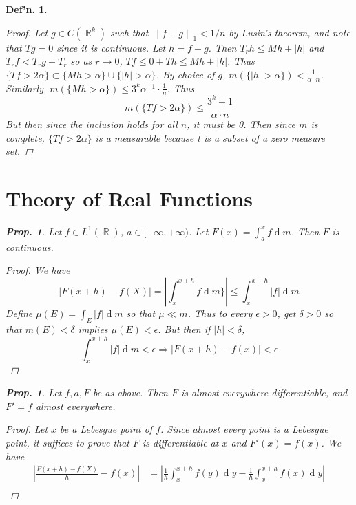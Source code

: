 \documentclass[12pt, a4paper]{book}
\DeclareMathOperator{\R}{\mathbb{R}}
\renewcommand{\d}[1]{\ensuremath{\operatorname{d}\!{#1}}} %
\newcommand{\norm}[1]{\left\lVert#1\right\rVert} %
\newtheorem{definition}[theorem]{Def'n.}
\newtheorem{proposition}[theorem]{Prop.}
\theoremstyle{nonumberplain}
\newtheorem{proof}{Proof}
\begin{document}
\begin{definition}
\begin{proof}
    Let $g\in C(\R^k)$ such that $\norm{f-g}_1<1/n$ by Lusin's theorem, and note that $Tg=0$ since it is continuous.
    Let $h=f-g$.
    Then $T_rh\leq Mh+|h|$ and $T_rf<T_rg+T_r$ so as $r\to 0$, $Tf\leq0+Th\leq Mh+|h|$.
    Thus $\{Tf>2\alpha\}\subset\{Mh>\alpha\}\cup\{|h|>\alpha\}$.
    By choice of $g$, $m(\{|h|>\alpha\})<\frac{1}{\alpha\cdot n}$.
    Similarly, $m(\{Mh>\alpha\})\leq 3^k\alpha^{-1}\cdot\frac{1}{n}$.
    Thus
    \[m(\{Tf>2\alpha\})\leq\frac{3^k+1}{\alpha\cdot n}\]
    But then since the inclusion holds for all $n$, it must be 0.
    Then since $m$ is complete, $\{Tf>2\alpha\}$ is a measurable because t is a subset of a zero measure set.
\end{proof}
\section{Theory of Real Functions}
\begin{proposition}
    Let $f\in L^1(\R)$, $a\in[-\infty,+\infty)$. %
    Let $F(x)=\int_a^x f\d{m}$.
    Then $F$ is continuous.
\end{proposition}
\begin{proof}
    We have
    \begin{equation*}
        |F(x+h)-f(X)| = \left\lvert\int_x^{x+h}f\d{m}\}\right\rvert\leq\int_x^{x+h}|f|\d{m}
    \end{equation*}
    Define $\mu(E)=\int_E|f|\d{m}$ so that $\mu\ll m$.
    Thus to every $\epsilon>0$, get $\delta>0$ so that $m(E)<\delta$ implies $\mu(E)<\epsilon$.
    But then if $|h|<\delta$,
    \begin{equation*}
        \int_x^{x+h}|f|\d{m}<\epsilon\Longrightarrow|F(x+h)-f(x)|<\epsilon
    \end{equation*}
\end{proof}
\begin{proposition}
    Let $f,a,F$ be as above.
    Then $F$ is almost everywhere differentiable, and $F'=f$ almost everywhere.
\end{proposition}
\begin{proof}
    Let $x$ be a Lebesgue point of $f$.
    Since almost every point is a Lebesgue point, it suffices to prove that $F$ is differentiable at $x$ and $F'(x)=f(x)$.
    We have
    \begin{align*}
        \left\lvert\frac{F(x+h)-f(X)}{h}-f(x)\right\rvert &= \left\lvert\frac{1}{h}\int_x^{x+h}f(y)\d{y}-\frac{1}{h}\int_x^{x+h} f(x)\d{y}\right\rvert\\

\end{align*}
\end{proof}
\end{definition}
\end{document}

